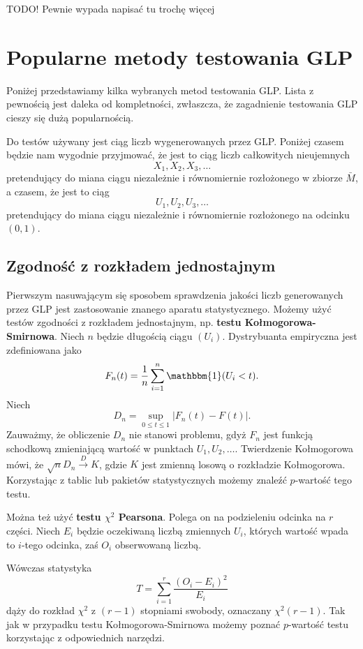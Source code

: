 \documentclass[a4paper,11pt,twoside]{book}
\newcommand{\Conv}{\longrightarrow}
\theoremstyle{definition}
\begin{document}
{\bigskip \color{red} \LARGE{TODO!} Pewnie wypada napisać tu trochę więcej}

\section{Popularne metody testowania GLP}
Poniżej przedstawiamy kilka wybranych metod testowania GLP. Lista z pewnością jest daleka od kompletności, zwłaszcza, że zagadnienie testowania GLP cieszy się dużą popularnością.

Do testów używany jest ciąg liczb wygenerowanych przez GLP. Poniżej czasem będzie nam wygodnie przyjmować, że jest to ciąg liczb całkowitych nieujemnych
\[ X_1, X_2, X_3, \ldots \]
pretendujący do miana ciągu niezależnie i równomiernie rozłożonego w zbiorze $\bar{M}$, a czasem, że jest to ciąg
\[ U_1, U_2, U_3, \ldots \]
pretendujący do miana ciągu niezależnie i równomiernie rozłożonego na odcinku $(0,1)$.

\subsection*{Zgodność z rozkładem jednostajnym}
Pierwszym nasuwającym się sposobem sprawdzenia jakości liczb generowanych przez GLP jest zastosowanie znanego aparatu statystycznego. Możemy użyć testów zgodności z rozkładem jednostajnym, np. \textbf{testu Kołmogorowa-Smirnowa}. Niech $n$ będzie długością ciągu $(U_i)$. Dystrybuanta empiryczna jest zdefiniowana jako
\[ F_n(t) = \frac{1}{n} \sum_{i=1}^n \mathbbm{1}(U_i < t). \]
Niech
\[ D_n = \sup_{0 \leq t \leq 1} |F_n(t) - F(t)|. \]
Zauważmy, że obliczenie $D_n$ nie stanowi problemu, gdyż $F_n$ jest funkcją schodkową zmieniającą wartość w punktach $U_1, U_2,\ldots$. Twierdzenie Kołmogorowa mówi, że $\sqrt{n} D_n \stackrel{D}{\Conv} K$, gdzie $K$ jest zmienną losową o rozkładzie Kołmogorowa. Korzystając z tablic lub pakietów statystycznych możemy znaleźć $p$-wartość tego testu.

Można też użyć \textbf{testu $\chi^2$ Pearsona}. Polega on na podzieleniu odcinka na $r$ części. Niech $E_i$ będzie oczekiwaną liczbą zmiennych $U_i$, których wartość wpada to $i$-tego odcinka, zaś $O_i$ obserwowaną liczbą.

Wówczas statystyka
\begin{equation}
 \label{eq:chisq}
 T = \sum_{i=1}^r \frac{(O_i - E_i)^2}{E_i} 
\end{equation}
dąży do rozkład $\chi^2$ z $(r-1)$ stopniami swobody, oznaczany $\chi^2(r-1)$. Tak jak w przypadku testu Kołmogorowa-Smirnowa możemy poznać $p$-wartość testu korzystając z odpowiednich narzędzi.
\end{document}
